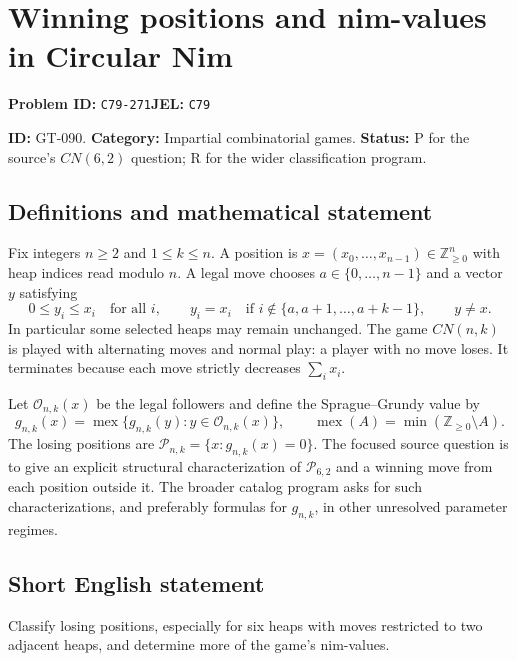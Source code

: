 \documentclass[11pt,a4paper]{article}
\begin{document}
\section*{Winning positions and nim-values in Circular Nim}
\textbf{Problem ID:} \texttt{C79-271}\quad \textbf{JEL:} \texttt{C79}\par
\label{problem:OP-0220}
\label{game:GT-090}
{\sffamily\small\color{muted}
\noindent\textbf{ID:} GT-090. \textbf{Category:} Impartial combinatorial games.
\textbf{Status:} P for the source's $CN(6,2)$ question; R for the wider classification program.
\par}
\subsection*{Definitions and mathematical statement}
Fix integers $n\geq2$ and $1\leq k\leq n$. A position is
$x=(x_0,\ldots,x_{n-1})\in\mathbb Z_{\geq0}^{n}$ with heap indices read modulo $n$. A legal move chooses $a\in\{0,\ldots,n-1\}$ and a vector $y$ satisfying
\[
 0\leq y_i\leq x_i\quad\text{for all }i,\qquad
 y_i=x_i\quad\text{if }i\notin\{a,a+1,\ldots,a+k-1\},\qquad y\neq x.
\]
In particular some selected heaps may remain unchanged. The game $CN(n,k)$ is played with alternating moves and normal play: a player with no move loses. It terminates because each move strictly decreases $\sum_i x_i$.

Let $\mathcal O_{n,k}(x)$ be the legal followers and define the Sprague--Grundy value by
\[
 g_{n,k}(x)=\operatorname{mex}\{g_{n,k}(y):y\in\mathcal O_{n,k}(x)\},
 \qquad \operatorname{mex}(A)=\min(\mathbb Z_{\geq0}\setminus A).
\]
The losing positions are $\mathcal P_{n,k}=\{x:g_{n,k}(x)=0\}$. The focused source question is to give an explicit structural characterization of
$\mathcal P_{6,2}$ and a winning move from each position outside it. The broader catalog program asks for such characterizations, and preferably formulas for $g_{n,k}$, in other unresolved parameter regimes.

\subsection*{Short English statement}
Classify losing positions, especially for six heaps with moves restricted to two adjacent heaps, and determine more of the game's nim-values.
\end{document}
